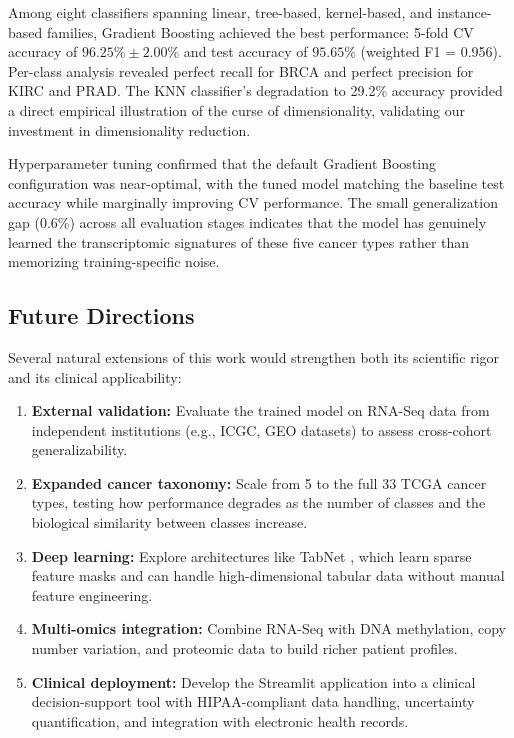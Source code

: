 \documentclass{article}
\begin{document}
Among eight classifiers spanning linear, tree-based, kernel-based, and instance-based families, Gradient Boosting achieved the best performance: 5-fold CV accuracy of $96.25\% \pm 2.00\%$ and test accuracy of $95.65\%$ (weighted F1 = 0.956). Per-class analysis revealed perfect recall for BRCA and perfect precision for KIRC and PRAD. The KNN classifier's degradation to 29.2\% accuracy provided a direct empirical illustration of the curse of dimensionality, validating our investment in dimensionality reduction.

Hyperparameter tuning confirmed that the default Gradient Boosting configuration was near-optimal, with the tuned model matching the baseline test accuracy while marginally improving CV performance. The small generalization gap (0.6\%) across all evaluation stages indicates that the model has genuinely learned the transcriptomic signatures of these five cancer types rather than memorizing training-specific noise.

\subsection{Future Directions}
Several natural extensions of this work would strengthen both its scientific rigor and its clinical applicability:
\begin{enumerate}[leftmargin=2em]
\item \textbf{External validation:} Evaluate the trained model on RNA-Seq data from independent institutions (e.g., ICGC, GEO datasets) to assess cross-cohort generalizability.
\item \textbf{Expanded cancer taxonomy:} Scale from 5 to the full 33 TCGA cancer types, testing how performance degrades as the number of classes and the biological similarity between classes increase.
\item \textbf{Deep learning:} Explore architectures like TabNet \citep{arik2021tabnet}, which learn sparse feature masks and can handle high-dimensional tabular data without manual feature engineering.
\item \textbf{Multi-omics integration:} Combine RNA-Seq with DNA methylation, copy number variation, and proteomic data to build richer patient profiles.
\item \textbf{Clinical deployment:} Develop the Streamlit application into a clinical decision-support tool with HIPAA-compliant data handling, uncertainty quantification, and integration with electronic health records.
\end{enumerate}
\end{document}
